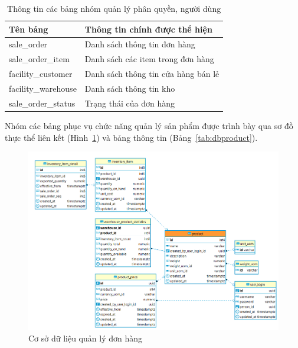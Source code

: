 \begin{table}[H]
\centering
\begin{tabular}{| m{5cm} | m{10cm} |}
\hline
\textbf{Tên bảng} & \textbf{Thông tin chính được thể hiện} \\
\hline
sale\_order &
Danh sách thông tin đơn hàng \\
\hline
sale\_order\_item &
Danh sách các item trong đơn hàng \\
\hline
facility\_customer &
Danh sách thông tin cửa hàng bán lẻ \\
\hline
facility\_warehouse &
Danh sách thông tin kho  \\
\hline
sale\_order\_status &
Trạng thái của đơn hàng \\
\hline
\end{tabular}
\caption{Thông tin các bảng nhóm quản lý phân quyền, người dùng}
\label{tab:dborder}
\end{table}

Nhóm các bảng phục vụ chức năng quản lý sản phẩm
được trình bày qua sơ đồ thực thể liên kết (Hình~\ref{fig:dbproduct})
và bảng thông tin (Bảng~\ref{tab:dbproduct}).
\begin{figure}[H]
\centering
\includegraphics[width=17cm]{images/database/product.png}
\caption{Cơ sở dữ liệu quản lý đơn hàng}
\label{fig:dbproduct}
\end{figure}

